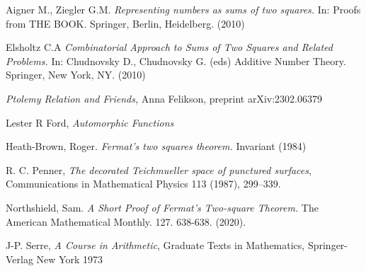\documentclass[12pt,a4paper]{amsart}
\begin{document}
%
%





Aigner M., Ziegler G.M.  
\textit{Representing numbers as sums of two squares.} In: Proofs from THE BOOK. Springer, Berlin, Heidelberg. (2010)




Elsholtz C.A 
\textit{Combinatorial Approach to Sums of Two Squares and Related Problems.}
 In: Chudnovsky D., Chudnovsky G. (eds) Additive Number Theory. Springer, New York, NY.
 (2010) 

\textit{Ptolemy Relation and Friends,}
Anna Felikson,
preprint arXiv:2302.06379

Lester R Ford,
\textit{Automorphic Functions}

Heath-Brown, Roger. 
\textit{ Fermat’s two squares theorem.} Invariant (1984) 



R. C. Penner, 
\textit{The decorated Teichmueller space of punctured surfaces}, 
Communications in Mathematical Physics 113 (1987), 299–339.


Northshield, Sam. 
\textit{A Short Proof of Fermat’s Two-square Theorem.} The American Mathematical Monthly. 127. 638-638. (2020). 

J-P. Serre,
\textit{A Course in Arithmetic},
Graduate Texts in Mathematics,
Springer-Verlag New York
1973
\end{document}
